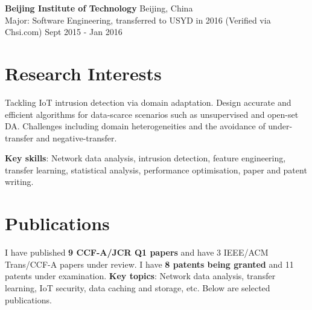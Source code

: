 \documentclass[letterpaper,11pt]{article}
\begin{document}
\vspace{9pt}

\textbf{Beijing Institute of Technology} \hfill Beijing, China\\
Major: Software Engineering, transferred to USYD in 2016 (Verified via Chsi.com) \hfill Sept 2015 - Jan 2016\\


\vspace{1pt}

\section{Research Interests}

Tackling IoT intrusion detection via domain adaptation. Design accurate and efficient algorithms for data-scarce scenarios such as unsupervised and open-set DA. Challenges including domain heterogeneities and the avoidance of under-transfer and negative-transfer. 

\textbf{Key skills}: Network data analysis, intrusion detection, feature engineering, transfer learning, statistical analysis, performance optimisation, paper and patent writing. 

\vspace{1pt}

\section{Publications}

I have published \textbf{9 CCF-A/JCR Q1 papers} and have 3 IEEE/ACM Trans/CCF-A papers under review. I have \textbf{8 patents being granted} and 11 patents under examination. \textbf{Key topics}: Network data analysis, transfer learning, IoT security, data caching and storage, etc. Below are selected publications. 
\end{document}
